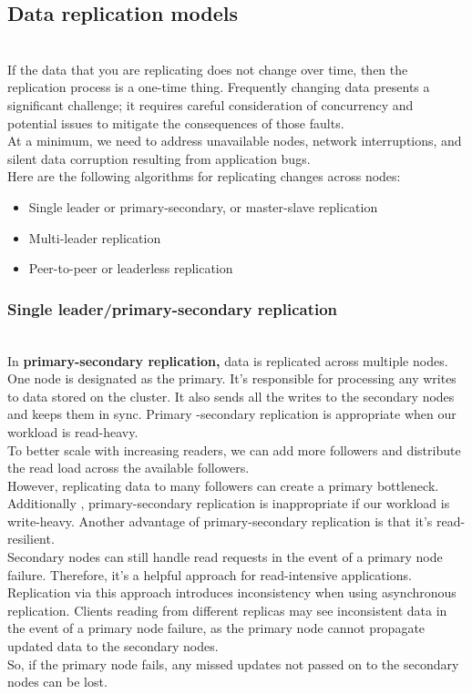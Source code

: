 \subsection{Data replication models}\label{uxqqL7juh-EpNn27TqMAS}
\\
If the data that you are replicating does not change over time, then the replication process is a one-time thing. Frequently changing data presents a significant challenge; it requires careful consideration of concurrency and potential issues to mitigate the consequences of those faults.
\\
At a minimum, we need to address unavailable nodes, network interruptions, and silent data corruption resulting from application bugs.
\\
Here are the following algorithms for replicating changes across nodes:

\begin{itemize}
\item
\protect{}\label{4RbFiAnJnk9YQVonQjVrH}
Single leader or primary-secondary, or master-slave replication
\item
\protect{}\label{5nr5oInKjShcSWU3H9sAM}
Multi-leader replication
\item
\protect{}\label{7Y6suULJlqI7RD9Q7PNd0}
Peer-to-peer or leaderless replication
\end{itemize}

\subsubsection{Single leader/primary-secondary replication}\label{pYxw4WM7PLhUF8M57wxrZ}
\\
In \textbf{primary-secondary replication,} data is replicated across multiple nodes.
\\
One node is designated as the primary. It's responsible for processing any writes to data stored on the cluster. It also sends all the writes to the secondary nodes and keeps them in sync. Primary -secondary replication is appropriate when our workload is read-heavy.
\\
To better scale with increasing readers, we can add more followers and distribute the read load across the available followers.
\\
However, replicating data to many followers can create a primary bottleneck. Additionally , primary-secondary replication is inappropriate if our workload is write-heavy. Another advantage of primary-secondary replication is that it's read-resilient.
\\
Secondary nodes can still handle read requests in the event of a primary node failure. Therefore, it's a helpful approach for read-intensive applications.
\\
Replication via this approach introduces inconsistency when using asynchronous replication. Clients reading from different replicas may see inconsistent data in the event of a primary node failure, as the primary node cannot propagate updated data to the secondary nodes.
\\
So, if the primary node fails, any missed updates not passed on to the secondary nodes can be lost.

